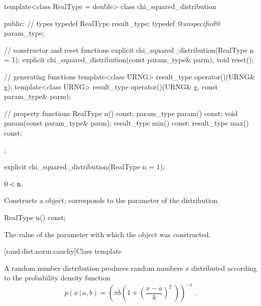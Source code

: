 \begin{codeblock}
template<class RealType = double>
 class chi_squared_distribution
{
public:
 // types
 typedef RealType result_type;
 typedef @\textit{unspecified}@ param_type;

 // constructor and reset functions
 explicit chi_squared_distribution(RealType n = 1);
 explicit chi_squared_distribution(const param_type& parm);
 void reset();

 // generating functions
 template<class URNG>
   result_type operator()(URNG& g);
 template<class URNG>
   result_type operator()(URNG& g, const param_type& parm);

 // property functions
 RealType n() const;
 param_type param() const;
 void param(const param_type& parm);
 result_type min() const;
 result_type max() const;
};
\end{codeblock}


%
\begin{itemdecl}
explicit chi_squared_distribution(RealType n = 1);
\end{itemdecl}

\begin{itemdescr}
\pnum\requires
 $ 0 < \texttt{n} $.

\pnum\effects Constructs a  object;
 corresponds to the parameter of the distribution.
\end{itemdescr}

%
%
\begin{itemdecl}
RealType n() const;
\end{itemdecl}

\begin{itemdescr}
\pnum\returns The value of the  parameter
 with which the object was constructed.
\end{itemdescr}


[rand.dist.norm.cauchy]{Class template }%

\pnum
A  random number distribution
produces random numbers $x$
distributed according to
the probability density function%
%
\[%
 p(x\,|\,a,b)
      = \left( \pi b \left( 1 + \left( \frac{x-a}{b}  \right)^2 \;\right)\right)^{-1}
\; \mbox{.}
\]

